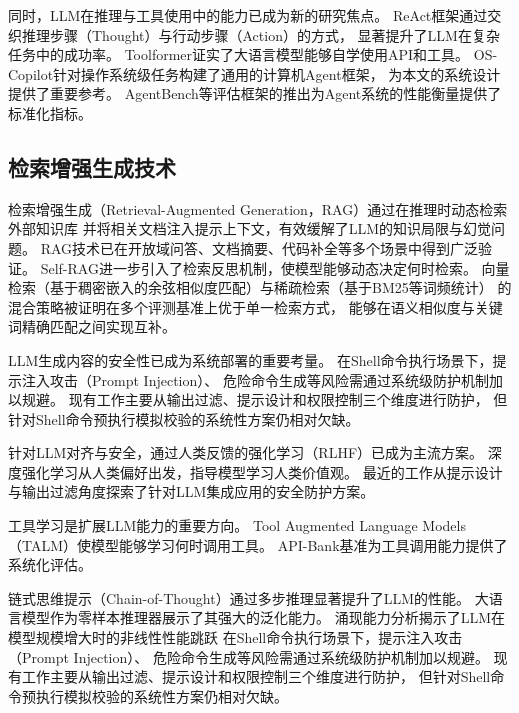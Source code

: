 同时，LLM在推理与工具使用中的能力已成为新的研究焦点。
ReAct框架通过交织推理步骤（Thought）与行动步骤（Action）的方式，
显著提升了LLM在复杂任务中的成功率。
Toolformer证实了大语言模型能够自学使用API和工具。
OS-Copilot针对操作系统级任务构建了通用的计算机Agent框架，
为本文的系统设计提供了重要参考。
AgentBench等评估框架的推出为Agent系统的性能衡量提供了标准化指标。

\subsection{检索增强生成技术}

检索增强生成（Retrieval-Augmented Generation，RAG）通过在推理时动态检索外部知识库
并将相关文档注入提示上下文，有效缓解了LLM的知识局限与幻觉问题。
RAG技术已在开放域问答、文档摘要、代码补全等多个场景中得到广泛验证。
Self-RAG进一步引入了检索反思机制，使模型能够动态决定何时检索。
向量检索（基于稠密嵌入的余弦相似度匹配）与稀疏检索（基于BM25等词频统计）
的混合策略被证明在多个评测基准上优于单一检索方式，
能够在语义相似度与关键词精确匹配之间实现互补。

LLM生成内容的安全性已成为系统部署的重要考量。
在Shell命令执行场景下，提示注入攻击（Prompt Injection）、
危险命令生成等风险需通过系统级防护机制加以规避。
现有工作主要从输出过滤、提示设计和权限控制三个维度进行防护，
但针对Shell命令预执行模拟校验的系统性方案仍相对欠缺。

针对LLM对齐与安全，通过人类反馈的强化学习（RLHF）已成为主流方案。
深度强化学习从人类偏好出发，指导模型学习人类价值观。
最近的工作从提示设计与输出过滤角度探索了针对LLM集成应用的安全防护方案。

工具学习是扩展LLM能力的重要方向。
Tool Augmented Language Models（TALM）使模型能够学习何时调用工具。
API-Bank基准为工具调用能力提供了系统化评估。

链式思维提示（Chain-of-Thought）通过多步推理显著提升了LLM的性能。
大语言模型作为零样本推理器展示了其强大的泛化能力。
涌现能力分析揭示了LLM在模型规模增大时的非线性性能跳跃
在Shell命令执行场景下，提示注入攻击（Prompt Injection）、
危险命令生成等风险需通过系统级防护机制加以规避。
现有工作主要从输出过滤、提示设计和权限控制三个维度进行防护，
但针对Shell命令预执行模拟校验的系统性方案仍相对欠缺。

